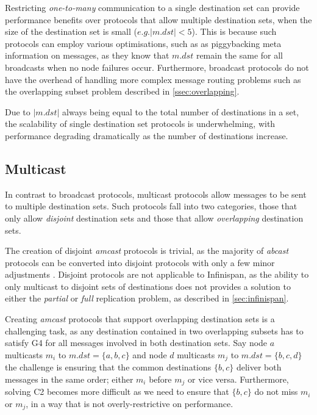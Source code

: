 	Restricting \emph{one-to-many} communication to a single destination set can provide performance benefits over protocols that allow multiple destination sets, when the size of the destination set is small ($e.g. \left\vert{m.dst}\right\vert < 5$).   This is because such protocols can employ various optimisations, such as as piggybacking meta information on messages, as they know that $m.dst$ remain the same for all broadcasts when no node failures occur.  Furthermore, broadcast protocols do not have the overhead of handling more complex message routing problems such as the overlapping subset problem described in \ref{ssec:overlapping}.  
	
	Due to $\left\vert{m.dst}\right\vert$ always being equal to the total number of destinations in a set, the scalability of single destination set protocols is underwhelming, with performance degrading dramatically as the number of destinations increase.  
	
	\subsection{Multicast}\label{atomic_multicast}
	In contrast to broadcast protocols, multicast protocols allow messages to be sent to multiple destination sets.  Such protocols fall into two categories, those that only allow \emph{disjoint} destination sets and those that allow \emph{overlapping} destination sets.  
	
	The creation of disjoint \emph{amcast} protocols is trivial, as the majority of \emph{abcast} protocols can be converted into disjoint protocols with only a few minor adjustments \cite{Defago:2004:TOB:1041680.1041682}.  Disjoint protocols are not applicable to Infinispan, as the ability to only multicast to disjoint sets of destinations does not provides a solution to either the \emph{partial} or \emph{full} replication problem, as described in \ref{sec:infinispan}.  
        
        Creating \emph{amcast} protocols that support overlapping destination sets is a challenging task, as any destination contained in two overlapping subsets has to satisfy G4 for all messages involved in both destination sets.  Say node $a$ multicasts $m_i$ to $m.dst = \{a,b,c\}$ and node $d$ multicasts $m_j$ to $m.dst = \{b,c,d\}$ the challenge is ensuring that the common destinations $\{b,c\}$ deliver both messages in the same order; either $m_i$ before $m_j$ or vice versa.  Furthermore, solving C2 becomes more difficult as we need to ensure that $\{b,c\}$ do not miss $m_i$ or $m_j$, in a way that is not overly-restrictive on performance.  
        
